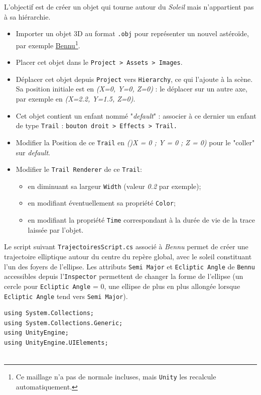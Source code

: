 \documentclass[a4paper,10pt]{article}
\newenvironment{solution}%
{\begin{tcolorbox}[breakable,colback=red!5!white,colframe=red!75!black,title=Solution]}%
{\end{tcolorbox}}
\begin{document}
\ifversionenseignant
\begin{solution}
L'objectif est de créer un objet qui tourne autour du \textit{Soleil} mais n'appartient pas à sa hiérarchie.

\begin{itemize}
	\item Importer un objet 3D au format \texttt{.obj} pour représenter un nouvel astéroïde, par exemple \href{https://nasa3d.arc.nasa.gov/detail/bennu}{Bennu}\footnote{Ce maillage n'a pas de normale incluses, mais \texttt{Unity} les recalcule automatiquement.}.
	\item Placer cet objet dans le \texttt{Project > Assets > Images}.
	\item Déplacer cet objet depuis \texttt{Project} vers \texttt{Hierarchy}, ce qui l'ajoute à la scène. Sa position initiale est en \textit{(X=0, Y=0, Z=0)} : le déplacer sur un autre axe, par exemple en \textit{(X=2.2, Y=1.5, Z=0)}.
	\item Cet objet contient un enfant nommé "\textit{default}" : associer à ce dernier un enfant de type \texttt{Trail} : \texttt{bouton droit > Effects > Trail.} 
	\item Modifier la Position de ce \texttt{Trail} en \textit{()X = 0 ; Y = 0 ; Z = 0)} pour le "coller" sur \textit{default}.
	\item Modifier le \texttt{Trail Renderer} de ce \texttt{Trail}:
	\begin{itemize}
		\item en diminuant sa largeur \texttt{Width} (valeur \textit{0.2} par exemple);
		\item en modifiant éventuellement sa propriété \texttt{Color};
		\item en modifiant la propriété \texttt{Time} correspondant à la durée de vie de la trace laissée par l'objet.
	\end{itemize}
\end{itemize}

Le script suivant \texttt{TrajectoiresScript.cs} associé à \textit{Bennu} permet de créer une trajectoire elliptique autour du centre du repère global, avec le soleil constituant l'un des foyers de l'ellipse. Les attributs \texttt{Semi Major} et \texttt{Ecliptic Angle} de \texttt{Bennu} accessibles depuis l'\texttt{Inspector} permettent de changer la forme de l'ellipse (un cercle pour \texttt{Ecliptic Angle} = $0$, une ellipse de plus en plus allongée lorsque \texttt{Ecliptic Angle} tend vers \texttt{Semi Major}).

\begin{lstlisting}
using System.Collections;
using System.Collections.Generic;
using UnityEngine;
using UnityEngine.UIElements;


\end{lstlisting}
\end{solution}
\end{document}
